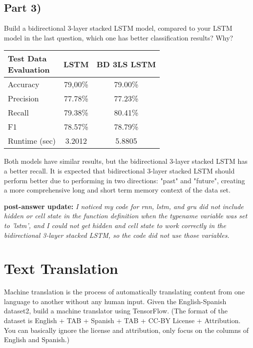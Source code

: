 \documentclass[conference]{IEEEtran}
\begin{document}
\subsection{Part 3)}
\par \noindent Build a bidirectional 3-layer stacked LSTM model, compared to your LSTM model in the last question, which one has better classification results? Why?
\begin{table}[H]
    \centering
    \begin{tabular}{|l|c|c|}
        \hline
        \makecell{Test Data\\ Evaluation} & LSTM & BD 3LS LSTM \\
        \hline
        Accuracy  	  & 79,00\% & 79.00\% \\
        Precision 	  & 77.78\% & 77.23\% \\
        Recall        & 79.38\% & 80.41\% \\
        F1       	  & 78.57\% & 78.79\% \\
        Runtime (sec) & 3.2012  & 5.8805 \\
        \hline
    \end{tabular}
\end{table}
Both models have similar results, but the bidirectional 3-layer stacked LSTM has a better recall. It is expected that bidirectional 3-layer stacked LSTM should perform better due to performing in two directions: "past" and "future", creating a more comprehensive long and short term memory context of the data set.\\

\par \textbf{post-answer update:} \textit{I noticed my code for rnn, lstm, and gru did not include hidden or cell state in the function definition when the type\textunderscore name variable was set to 'lstm', and I could not get hidden and cell state to work correctly in the bidirectional 3-layer stacked LSTM, so the code did not use those variables.}

\section{Text Translation}
\par \noindent Machine translation is the process of automatically translating content from one language to another without any human input. Given the English-Spanish dataset2, build a machine translator using TensorFlow. (The format of the dataset is English + TAB + Spanish + TAB + CC-BY License + Attribution. You can basically ignore the license and attribution, only focus on the columns of English and Spanish.)
\end{document}
